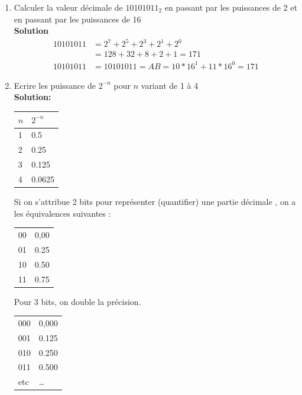 \documentclass[a4paper,11pt]{article}
\begin{document}
\begin{enumerate}
On remarque que $2^{10}\approx 10^3$. D'où : $\log 2\approx \frac{3}{10}$ (en fait $\log 2=0.301$ à $10^{-3}$ près. L'erreur est de 0.3\%)
De même :
$$5=\frac{10}{2} \implies \log_{10} 5 \approx \frac{7}{10}$$
Pour la curiosité, on peut procéder de même pour $\log_{10} 3$ en remarquant que $3^4\approx 4^2.5$. On en déduit :
$$\log_{10} 3 \approx \log_{10}2+\frac{\log_{10}5}{4}\approx \frac{19}{40}$$
Pour rappel, le logarithme décimal s'appelle simplement \texttt{log}. Il est également connu sous le terme de "logarithme vulgaire".

\item{Calculer la valeur décimale de $10101011_2$ en passant par les puissances de 2 et en passant par les puissances de 16}\\

{\bf Solution}
\begin{align}
10101011 &= 2^7 + 2^5 + 2^3+ 2^1 + 2^0 \nonumber\\
         & = 128 +32 +8 +2 +1 = 171 \nonumber \\
10101011 &= 1010 1011 = AB= 10*16^1 + 11*16^0 = 171 \nonumber
\end{align}

\item{Ecrire les puissance de $2^{-n}$ pour $n$ variant de 1 à 4}\\

{\bf Solution:}
\begin{center}
  \begin{tabular}{|l|l|}
    \hline
    $n$ & $2^{-n}$ \\
    \hline \hline
    1 & 0.5 \\
    2 & 0.25 \\
    3 & 0.125 \\
    4 & 0.0625 \\
     \hline
  \end{tabular}
\end{center}

Si on s'attribue 2 bits pour représenter (quantifier) une partie décimale , on a les équivalences suivantes :
\begin{center}
  \begin{tabular}{l|l}
    00 & 0,00 \\
    01 & 0.25 \\
    10 & 0.50 \\
    11 & 0.75 \\
  \end{tabular}
\end{center}

Pour 3 bits, on double la précision.
\begin{center}
  \begin{tabular}{l|l}
    000 & 0,000 \\
    001 & 0.125 \\
    010 & 0.250 \\
    011 & 0.500 \\
    etc & \dots
  \end{tabular}
\end{center}

\end{enumerate}
\end{document}
